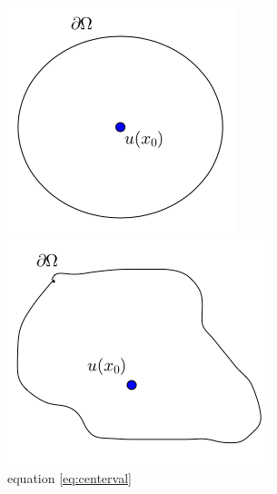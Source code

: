 \begin{figure}[!htb]%
  \includegraphics[width=\linewidth]{styles/CircCenter}
  \caption{equation \ref{eq:centerval}}\label{fig:circcenter}
\endminipage\hfill
{}
  \vspace{1.7mm}
  \includegraphics[width=\linewidth]{styles/GeneralOffset}

\end{figure}
